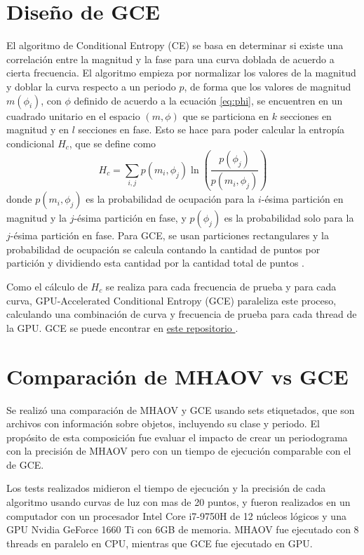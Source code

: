 \section{Diseño de GCE}\label{sec:gce}
El algoritmo de Conditional Entropy (CE) se basa en determinar si existe una correlación entre la magnitud y la fase para una curva doblada de acuerdo a cierta frecuencia. El algoritmo empieza por normalizar los valores de la magnitud y doblar la curva respecto a un periodo $p$, de forma que los valores de magnitud $m(\phi_i)$, con $\phi$ definido de acuerdo a la ecuación \ref{eq:phi}, se encuentren en un cuadrado unitario en el espacio $(m, \phi)$ que se particiona en $k$ secciones en magnitud y en $l$ secciones en fase. Esto se hace para poder calcular la entropía condicional $H_c$, que se define como
\begin{equation}
\label{eq:ce}
H_c = \sum_{i, j} p(m_i, \phi_j)\ln \left ( \frac{p(\phi_j)}{p(m_i, \phi_j)} \right )
\end{equation}
donde $p(m_i, \phi_j)$ es la probabilidad de ocupación para la $i$-ésima partición en magnitud y la $j$-ésima partición en fase, y $p(\phi_j)$ es la probabilidad solo para la $j$-ésima partición en fase. Para GCE, se usan particiones rectangulares y la probabilidad de ocupación se calcula contando la cantidad de puntos por partición y dividiendo esta cantidad por la cantidad total de puntos \cite{graham-entropy}.

Como el cálculo de $H_c$ se realiza para cada frecuencia de prueba y para cada curva, GPU-Accelerated Conditional Entropy (GCE) paraleliza este proceso, calculando una combinación de curva y frecuencia de prueba para cada thread de la GPU. GCE se puede encontrar en \href{https://github.com/mikekatz04/gce}{este repositorio }.


\section{Comparación de MHAOV vs GCE}\label{sec:mhaov-vs-gce}
Se realizó una comparación de MHAOV y GCE usando sets etiquetados, que son archivos con información sobre objetos, incluyendo su clase y periodo. El propósito de esta composición fue evaluar el impacto de crear un periodograma con la precisión de MHAOV pero con un tiempo de ejecución comparable con el de GCE.

Los tests realizados midieron el tiempo de ejecución y la precisión de cada algoritmo usando curvas de luz con mas de 20 puntos, y fueron realizados en un computador con un procesador Intel Core i7-9750H de 12 núcleos lógicos y una GPU Nvidia GeForce 1660 Ti con 6GB de memoria. MHAOV fue ejecutado con $8$ threads en paralelo en CPU, mientras que GCE fue ejecutado en GPU.

